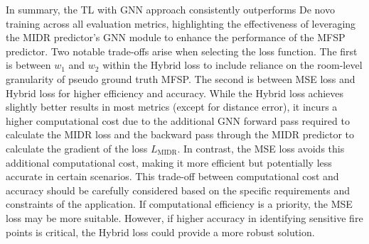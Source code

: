 In summary, the TL with GNN approach consistently outperforms De novo training across all evaluation metrics, highlighting the effectiveness of leveraging the MIDR predictor's GNN module to enhance the performance of the MFSP predictor. Two notable trade-offs arise when selecting the loss function.
The first is between $w_1$ and $w_2$ within the Hybrid loss to include reliance  on the room-level granularity of pseudo ground truth MFSP. 
The second is between MSE loss and Hybrid loss for higher efficiency and accuracy. While the Hybrid loss achieves slightly better results in most metrics (except for distance error), it incurs a higher computational cost due to the additional GNN forward pass required to calculate the MIDR loss and the backward pass through the MIDR predictor to calculate the gradient of the loss $L_{\text{MIDR}}$. In contrast, the MSE loss avoids this additional computational cost, making it more efficient but potentially less accurate in certain scenarios. This trade-off between computational cost and accuracy should be carefully considered based on the specific requirements and constraints of the application. If computational efficiency is a priority, the MSE loss may be more suitable. However, if higher accuracy in identifying sensitive fire points is critical, the Hybrid loss could provide a more robust solution.